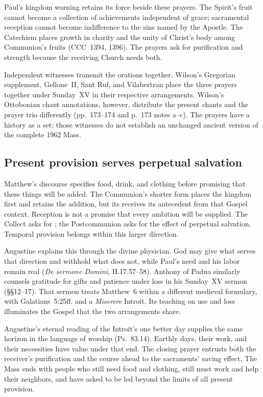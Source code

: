Paul's kingdom warning retains its force beside these prayers. The Spirit's
fruit cannot become a collection of achievements independent of grace;
sacramental reception cannot become indifference to the sins named by the
Apostle. The Catechism places growth in charity and the unity of Christ's body among
Communion's fruits (CCC~1394, 1396). The prayers ask for purification and
strength because the receiving Church needs both.

Independent witnesses transmit the orations together. Wilson's
Gregorian supplement, Gellone~II, Sant Ruf, and Vilabertran place the three
prayers together under Sunday~XV in their respective arrangements. Wilson's
Ottobonian chant annotations, however, distribute the present chants and the
prayer trio differently (pp.~173--174 and p.~173 notes a--c). The prayers have
a history as a set; those witnesses do not establish an unchanged ancient
version of the complete 1962 Mass.

\subsection*{Present provision serves perpetual salvation\enspace{}}

Matthew's discourse specifies food, drink, and clothing before promising that
these things will be added. The Communion's shorter form places the kingdom
first and retains the addition, but its  receives its antecedent
from that Gospel context. Reception is not a promise that every ambition will
be supplied. The Collect asks for ; the Postcommunion asks for
the effect of perpetual salvation. Temporal provision belongs within this
larger direction.

Augustine explains this through the divine physician. God may give
what serves that direction and withhold what does not, while Paul's need and
his labor remain real (\emph{De sermone Domini}, II.17.57--58). Anthony of
Padua similarly counsels gratitude for gifts and patience under loss in his
Sunday~XV sermon (§§12--17). That sermon treats Matthew~6 within a different
medieval formulary, with Galatians~5:25ff. and a \emph{Miserere} Introit.
Its teaching on use and loss illuminates the Gospel that the two
arrangements share.

Augustine's eternal reading of the Introit's one better day supplies the same
horizon in the language of worship (Ps.~83.14). Earthly days, their work, and
their necessities have value under that end. The closing prayer entrusts both
the receiver's purification and the course ahead to the sacraments' saving
effect. The Mass ends with people who still need food and clothing, still
must work and help their neighbors, and have asked to be led beyond the
limits of all present provision.

